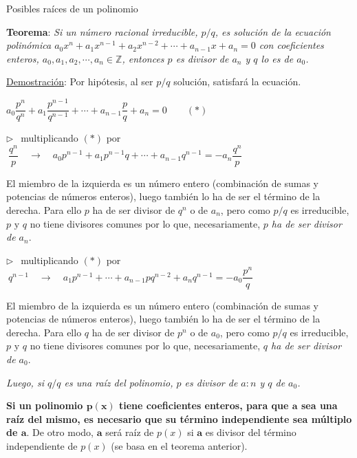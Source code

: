 \vspace{5mm}
\begin{myalertblock}{Posibles raíces de un polinomio}
	

\textbf{Teorema}:	\emph{Si un número racional irreducible, $p/q$, es solución de la ecuación polinómica $a_0x^n+a_1x^{n-1}+a_2x^{n-2}+\cdots +a_{n-1}x+a_n=0$ con coeficientes enteros, $a_0,a_1,a_2,\cdots, a_n \in \mathbb Z$, entonces $p$ es divisor de $a_n$ y $q$ lo es de $a_0$.}
\vspace{5mm}

\underline{Demostración}: Por hipótesis, al ser $p/q$ solución, satisfará la ecuación.

\vspace{2mm} $a_0 \dfrac{p^n}{q^n}+a_1 \dfrac{p^{n-1}}{q^{n-1}}+\cdots +a_{n-1}\dfrac p q +a_n=0 \qquad (*)$

\vspace{2mm} $\triangleright \ \ $ multiplicando $(*)$ por $\ \dfrac {q^n}{p} \quad \to \quad 
a_0p^{n-1}+a_1p^{n-1}q+\cdots +a_{n-1}q^{n-1}=-a_n \dfrac{q^n}{p}$

\vspace{2mm} El miembro de la izquierda es un número entero (combinación de sumas y potencias de números enteros), luego también lo ha de ser el término de la derecha. Para ello $p$ ha de ser divisor de $q^n$ o de $a_n$, pero como $p/q$ es irreducible, $p \text{ y } q$ no tiene divisores comunes por lo que, necesariamente, \emph{$p$ ha de ser divisor de $a_n$}.

\vspace{2mm} $\triangleright \ \ $ multiplicando $(*)$ por $\ q^{n-1} \quad \to \quad 
a_1p^{n-1}+\cdots +a_{n-1}pq^{n-2}+a_nq^{n-1}=-a_0 \dfrac{p^n}{q}$

\vspace{2mm} El miembro de la izquierda es un número entero (combinación de sumas y potencias de números enteros), luego también lo ha de ser el término de la derecha. Para ello $q$ ha de ser divisor de $p^n$ o de $a_0$, pero como $p/q$ es irreducible, $p \text{ y } q$ no tiene divisores comunes por lo que, necesariamente, \emph{$q$ ha de ser divisor de $a_0$}.

\vspace{2mm} \emph{Luego, si $q/q$ es una raíz del polinomio, $p$ es divisor de $a:n$ y $q$ de $a_0$.}\QED
\end{myalertblock}
\vspace{5mm}

\begin{theorem} 
\textbf{Si un polinomio $\boldsymbol{p(x)}$ tiene coeficientes enteros, para que $\boldsymbol a$ sea una raíz del mismo, es necesario que su término independiente sea múltiplo de $\boldsymbol a$}. De otro modo, $\boldsymbol a$ será raíz de $p(x)$ si $\boldsymbol a$ es divisor del término independiente de $p(x)$ \textcolor{gris}{(se basa en el teorema anterior).}
\end{theorem}

